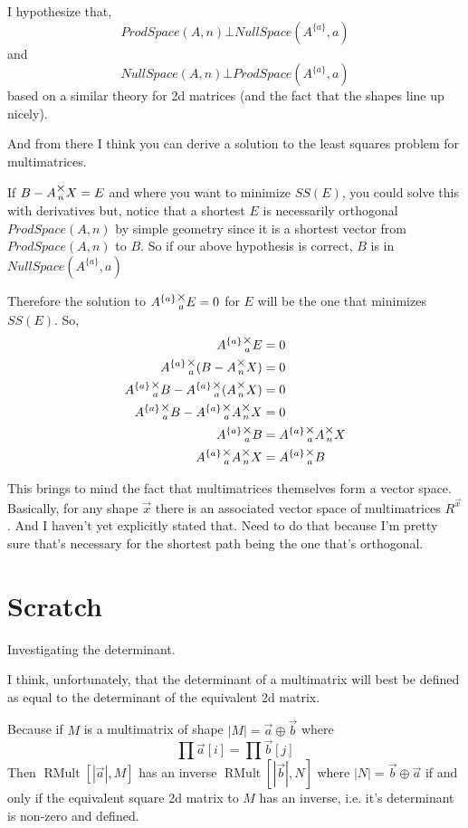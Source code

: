 \documentclass[12pt]{book}
\theoremstyle{plain}
\theoremstyle{definition}
\theoremstyle{ppart}
\theoremstyle{case}
\theoremstyle{solution}
\DeclareMathOperator{\RMult}{RMult}
\newcommand{\mmult}[1]{\text{\raisebox{1ex}{$\underset{#1}{\times}$}}}
\newcommand{\shape}[1]{\left|#1\right|}
\newcommand{\transpose}[2]{{#1}^{\{#2\}}}
\begin{document}
\begin{appendices}
I hypothesize that,
\[ProdSpace(A, n) \bot NullSpace(\transpose{A}{a}, a)\]
and
\[NullSpace(A, n) \bot ProdSpace(\transpose{A}{a}, a)\]
based on a similar theory for 2d matrices \cite{youtube:orthogonal} (and the fact that the shapes line up nicely).

And from there I think you can derive a solution to the least squares problem for multimatrices.

If $B - A \mmult{n} X = E$ and where you want to minimize $SS(E)$, you could solve this with derivatives
but, notice that a shortest $E$ is necessarily orthogonal $ProdSpace(A,n)$ by simple geometry since it is a shortest
vector from $ProdSpace(A,n)$ to $B$. So if our above hypothesis is correct, $B$ is in $NullSpace(\transpose{A}{a}, a)$

Therefore the solution to $\transpose{A}{a} \mmult{a} E = 0$ for $E$ will be the one that minimizes $SS(E)$. So,
\begin{align*}
  \transpose{A}{a} \mmult{a} E &= 0 \\
  \transpose{A}{a} \mmult{a} (B - A \mmult{n} X) &= 0 \\
  \transpose{A}{a} \mmult{a} B - \transpose{A}{a} \mmult{a} (A \mmult{n} X) &= 0 \\
  \transpose{A}{a} \mmult{a} B - \transpose{A}{a} \mmult{a} A \mmult{n} X &= 0 \\
  \transpose{A}{a} \mmult{a} B &= \transpose{A}{a} \mmult{a} A \mmult{n} X \\
  \transpose{A}{a} \mmult{a} A \mmult{n} X &= \transpose{A}{a} \mmult{a} B
\end{align*}

This brings to mind the fact that multimatrices themselves form a vector space. Basically, for any shape $\vec{x}$
there is an associated vector space of multimatrices $R^{\vec{x}}$. And I haven't yet explicitly stated that. Need to do
that because I'm pretty sure that's necessary for the shortest path being the one that's orthogonal.

\chapter{Scratch}

Investigating the determinant.

I think, unfortunately, that the determinant of a multimatrix will best be defined as
equal to the determinant of the equivalent 2d matrix.

Because if $M$ is a multimatrix of shape $\shape{M} = \vec{a} \oplus \vec{b}$ where
\[\prod \vec{a}[i] = \prod \vec{b}[j]\]
Then $\RMult[\shape{\vec{a}},M]$ has an inverse $\RMult[\shape{\vec{b}},N]$
where $\shape{N} = \vec{b} \oplus \vec{a}$ if and only if the
equivalent square 2d matrix to $M$ has an inverse, i.e. it's determinant is non-zero and defined.


\end{appendices}
\end{document}
